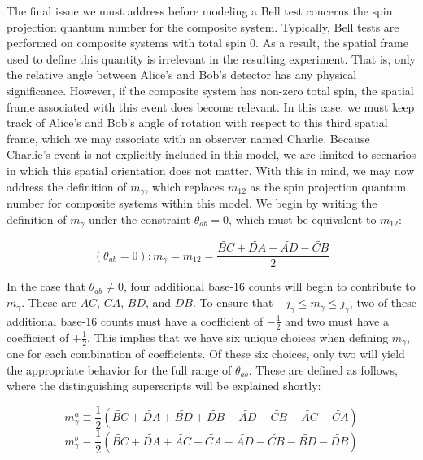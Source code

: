 \documentclass{article}
\begin{document}
The final issue we must address before modeling a Bell test concerns the spin projection quantum number for the composite system. Typically, Bell tests are performed on composite systems with total spin $0$. As a result, the spatial frame used to define this quantity is irrelevant in the resulting experiment. That is, only the relative angle between Alice's and Bob's detector has any physical significance. However, if the composite system has non-zero total spin, the spatial frame associated with this event does become relevant. In this case, we must keep track of Alice's and Bob's angle of rotation with respect to this third spatial frame, which we may associate with an observer named Charlie. Because Charlie's event is not explicitly included in this model, we are limited to scenarios in which this spatial orientation does not matter.  With this in mind, we may now address the definition of $m_\gamma$, which replaces $m_{12}$ as the spin projection quantum number for composite systems within this model. We begin by writing the definition of $m_\gamma$ under the constraint $\theta_{ab}=0$, which must be equivalent to $m_{12}$:

\begin{equation}
    (\theta_{ab}=0): m_\gamma=m_{12}=\frac{\widetilde{BC}+\widetilde{DA}-\widetilde{AD}-\widetilde{CB}}{2}
\end{equation}

In the case that $\theta_{ab}\neq0$, four additional base-16 counts will begin to contribute to $m_\gamma$. These are $\widetilde{AC}$, $\widetilde{CA}$, $\widetilde{BD}$, and $\widetilde{DB}$. To ensure that $-j_\gamma\leq m_\gamma \leq j_\gamma$, two of these additional base-16 counts must have a coefficient of $-\frac{1}{2}$ and two must have a coefficient of $+\frac{1}{2}$. This implies that we have six unique choices when defining $m_\gamma$, one for each combination of coefficients. Of these six choices, only two will yield the appropriate behavior for the full range of $\theta_{ab}$. These are defined as follows, where the distinguishing superscripts will be explained shortly:

\begin{equation}
    m^a_\gamma\equiv\frac{1}{2}(\widetilde{BC}+\widetilde{DA}+\widetilde{BD}+\widetilde{DB}-\widetilde{AD}-\widetilde{CB}-\widetilde{AC}-\widetilde{CA})
    \label{eq: m_gamma alice}
\end{equation}
\begin{equation}
    m^b_\gamma\equiv\frac{1}{2}(\widetilde{BC}+\widetilde{DA}+\widetilde{AC}+\widetilde{CA}-\widetilde{AD}-\widetilde{CB}-\widetilde{BD}-\widetilde{DB})
    \label{eq: m_gamma bob}
\end{equation}
\end{document}
